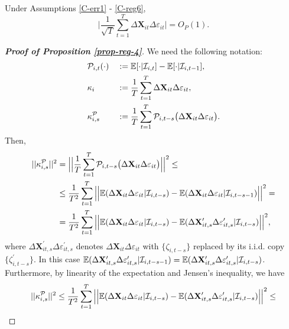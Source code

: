 \begin{prop}\label{prop-reg-4}
Under Assumptions \ref{C-err1} - \ref{C-reg6},
\[ \Big| \frac{1}{\sqrt{T}}\sum_{t=1}^T \Delta \mathbf{X}_{it}\Delta \varepsilon_{it} \Big| = O_P(1).
\]
\end{prop}

\begin{proof}[\textnormal{\textbf{Proof of Proposition \ref{prop-reg-4}}}]
We need the following notation:
\begin{alignat*}{2}
&\mathcal{P}_{i,t}(\cdot) &&:= \mathbb{E}[\cdot|\mathcal{I}_{i, t}] -\mathbb{E}[\cdot|\mathcal{I}_{i, t-1}], \\
&\kappa_{i} && := \frac{1}{T}\sum_{t=1}^T  \Delta \mathbf{X}_{it}\Delta \varepsilon_{it}, \\
&\kappa_{i, s}^{\mathcal{P}} && := \frac{1}{T}\sum_{t=1}^T \mathcal{P}_{i, t-s}\big( \Delta \mathbf{X}_{it}\Delta \varepsilon_{it}\big).
\end{alignat*}
Then,
\begin{align*}
||\kappa_{i, s}^{\mathcal{P}}||^2 &= \Big|\Big| \frac{1}{T}\sum_{t=1}^T \mathcal{P}_{i, t-s}\big( \Delta \mathbf{X}_{it}\Delta \varepsilon_{it}\big) \Big|\Big|^2 \leq\\
&\leq \frac{1}{T^2} \sum_{t=1}^T \Big|\Big| \mathbb{E} (\Delta \mathbf{X}_{it}\Delta \varepsilon_{it}|\mathcal{I}_{i, t-s}) -\mathbb{E} (\Delta \mathbf{X}_{it}\Delta \varepsilon_{it}|\mathcal{I}_{i, t-s-1}) \Big|\Big|^2 =\\
&= \frac{1}{T^2} \sum_{t=1}^T \Big|\Big| \mathbb{E} (\Delta \mathbf{X}_{it}\Delta \varepsilon_{it}|\mathcal{I}_{i, t-s}) -\mathbb{E} (\Delta \mathbf{X}_{it, s}^\prime\Delta \varepsilon_{it, s}^\prime|\mathcal{I}_{i, t-s}) \Big|\Big|^2,
\end{align*}
where $\Delta \mathbf{X}_{it, s}^\prime\Delta \varepsilon_{it, s}^\prime$ denotes $\Delta \mathbf{X}_{it}\Delta \varepsilon_{it}$ with $\{\zeta_{i, t-s}\}$ replaced by its i.i.d. copy $\{\zeta_{i, t-s}^\prime\}$. In this case $\mathbb{E} (\Delta \mathbf{X}_{it, s}^\prime\Delta \varepsilon_{it, s}^\prime|\mathcal{I}_{i, t-s -1}) = \mathbb{E} (\Delta \mathbf{X}_{it, s}^\prime\Delta \varepsilon_{it, s}^\prime|\mathcal{I}_{i, t-s})$. Furthermore, by linearity of the expectation and Jensen's inequality, we have 
\begin{align*}
||\kappa_{i, s}^{\mathcal{P}}||^2 &\leq \frac{1}{T^2} \sum_{t=1}^T \Big|\Big| \ex (\Delta \mathbf{X}_{it}\Delta \varepsilon_{it}|\mathcal{I}_{i, t-s}) -\ex (\Delta \mathbf{X}_{it, s}^\prime\Delta \varepsilon_{it, s}^\prime|\mathcal{I}_{i, t-s}) \Big|\Big|^2 \leq \\

\end{align*}
\end{proof}
